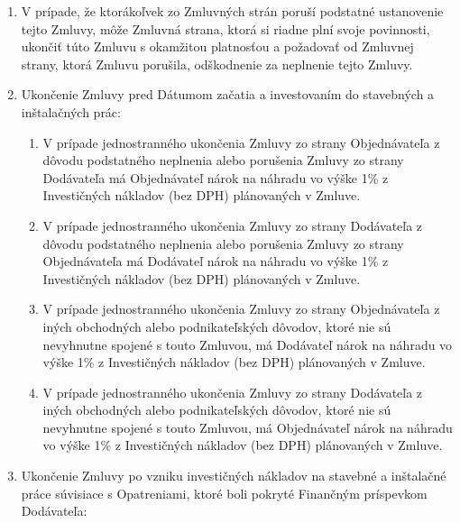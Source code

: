 \begin{multicols}{2}
\begin{enumerate}
\def\labelenumi{\arabic{enumi}.}
\item
  V prípade, že ktorákoľvek zo Zmluvných strán poruší podstatné
  ustanovenie tejto Zmluvy, môže Zmluvná strana, ktorá si riadne plní
  svoje povinnosti, ukončiť túto Zmluvu s okamžitou platnosťou a
  požadovať od Zmluvnej strany, ktorá Zmluvu porušila, odškodnenie za
  neplnenie tejto Zmluvy.
\item
  Ukončenie Zmluvy pred Dátumom začatia a investovaním do stavebných a
  inštalačných prác:

  \begin{enumerate}
  \def\labelenumii{\arabic{enumii}.}
  \item
    V prípade jednostranného ukončenia Zmluvy zo strany Objednávateľa z
    dôvodu podstatného neplnenia alebo porušenia Zmluvy zo strany
    Dodávateľa má Objednávateľ nárok na náhradu vo výške 1\% z
    Investičných nákladov (bez DPH) plánovaných v Zmluve.
  \item
    V prípade jednostranného ukončenia Zmluvy zo strany Dodávateľa z
    dôvodu podstatného neplnenia alebo porušenia Zmluvy zo strany
    Objednávateľa má Dodávateľ nárok na náhradu vo výške 1\% z
    Investičných nákladov (bez DPH) plánovaných v Zmluve.
  \item
    V prípade jednostranného ukončenia Zmluvy zo strany Objednávateľa z
    iných obchodných alebo podnikateľských dôvodov, ktoré nie sú
    nevyhnutne spojené s touto Zmluvou, má Dodávateľ nárok na náhradu vo
    výške 1\% z Investičných nákladov (bez DPH) plánovaných v Zmluve.
  \item
    V prípade jednostranného ukončenia Zmluvy zo strany Dodávateľa z
    iných obchodných alebo podnikateľských dôvodov, ktoré nie sú
    nevyhnutne spojené s touto Zmluvou, má Objednávateľ nárok na náhradu
    vo výške 1\% z Investičných nákladov (bez DPH) plánovaných v Zmluve.
  \end{enumerate}
\item
  Ukončenie Zmluvy po vzniku investičných nákladov na stavebné a
  inštalačné práce súvisiace s Opatreniami, ktoré boli pokryté Finančným
  príspevkom Dodávateľa:


\end{enumerate}
\end{multicols}
